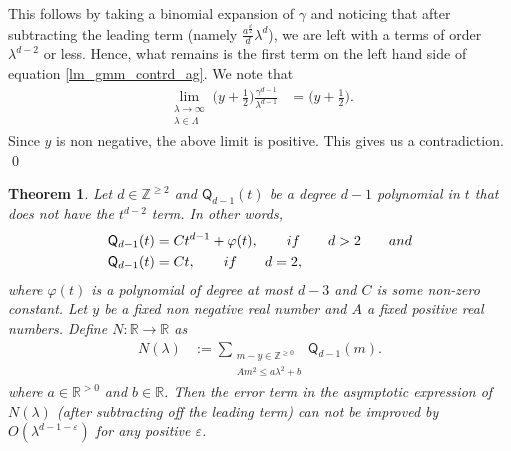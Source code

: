 \documentclass[11pt,lettersize,reqno,fullpage]{amsart}
\newtheorem{thm}{Theorem}[section]
\begin{document}
This follows by taking a binomial expansion of $\gamma$ and noticing that after subtracting the 
leading term (namely $\frac{a^{\frac{d}{2}}}{d} \lambda^{d}$), we are left with a terms of order $\lambda^{d-2}$ or less. 
Hence, what remains is the first term on the left hand side of equation 
\eqref{lm_gmm_contrd_ag}. 
We note that 
\begin{align*} 
\lim_{\substack{\lambda \longrightarrow \infty\\ \lambda \in \Lambda}} 
\Big(y+\frac{1}{2}\Big) \frac{\gamma^{d-1}}{\lambda^{d-1}} & = \Big(y+ \frac{1}{2}\Big).
\end{align*} 
Since $y$ is non negative, the above limit is positive. This gives us a contradiction. \qed 


\begin{thm}
\label{Auxiliary_result_2}
Let $d \in \mathbb{Z}^{\geq 2}$  
and $\mathsf{Q}_{d-1}(t)$ be a degree $d-1$ polynomial in $t$ that does not have the $t^{d-2}$ term. In other words, 
\begin{align}
\mathsf{Q}_{d-1}(t) & = C t^{d-1} + \varphi(t), \qquad \textnormal{if} \qquad d>2 \qquad \textnormal{and} \nonumber \\ 
\mathsf{Q}_{d-1}(t) & = C t, \qquad \textnormal{if} \qquad d=2, \nonumber 
\end{align}
where $\varphi(t)$ is a polynomial of degree at most $d-3$ and 
$C$ is some non-zero constant. 
Let $y$ be a fixed non negative real number and 
$A$ a fixed positive real numbers. 
Define 
$N:\mathbb{R}\longrightarrow \mathbb{R}$ 
as  
\begin{align}
N(\lambda) & := \sum_{\substack{m-y \in \mathbb{Z}^{\geq 0}\\ A m^2 \leq a \lambda^2 + b}}
\mathsf{Q}_{d-1}(m). 
\end{align} 
where $a \in \mathbb{R}^{>0}$ and $b \in \mathbb{R}$. 
Then the error term in the asymptotic expression of $N(\lambda)$ 
(after subtracting off the leading term) can not be improved by $O(\lambda^{d-1-\varepsilon})$ 
for any positive $\varepsilon$. 
\end{thm} 
\end{document}
